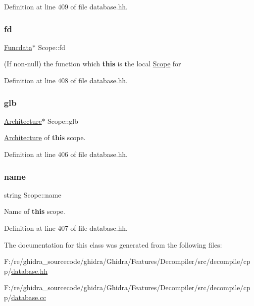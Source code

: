 Definition at line 409 of file database.\+hh.

\mbox{\label{class_scope_a72f6c31e73c46216482a6902d22b3330}} 
\subsubsection{\texorpdfstring{fd}{fd}}
{\footnotesize\ttfamily \mbox{\hyperlink{class_funcdata}{Funcdata}}$\ast$ Scope\+::fd\hspace{0.3cm}{\ttfamily [protected]}}



(If non-\/null) the function which {\bfseries{this}} is the local \mbox{\hyperlink{class_scope}{Scope}} for 



Definition at line 408 of file database.\+hh.

\mbox{\label{class_scope_aa5939cb5690f2f2b4f52a88ae561622d}} 
\subsubsection{\texorpdfstring{glb}{glb}}
{\footnotesize\ttfamily \mbox{\hyperlink{class_architecture}{Architecture}}$\ast$ Scope\+::glb\hspace{0.3cm}{\ttfamily [protected]}}



\mbox{\hyperlink{class_architecture}{Architecture}} of {\bfseries{this}} scope. 



Definition at line 406 of file database.\+hh.

\mbox{\label{class_scope_abb4900f6409e8a82c1b1cea827e4e2c5}} 
\subsubsection{\texorpdfstring{name}{name}}
{\footnotesize\ttfamily string Scope\+::name\hspace{0.3cm}{\ttfamily [protected]}}



Name of {\bfseries{this}} scope. 



Definition at line 407 of file database.\+hh.



The documentation for this class was generated from the following files\+:\begin{DoxyCompactItemize}
\item 
F\+:/re/ghidra\+\_\+sourcecode/ghidra/\+Ghidra/\+Features/\+Decompiler/src/decompile/cpp/\mbox{\hyperlink{database_8hh}{database.\+hh}}\item 
F\+:/re/ghidra\+\_\+sourcecode/ghidra/\+Ghidra/\+Features/\+Decompiler/src/decompile/cpp/\mbox{\hyperlink{database_8cc}{database.\+cc}}\end{DoxyCompactItemize}
